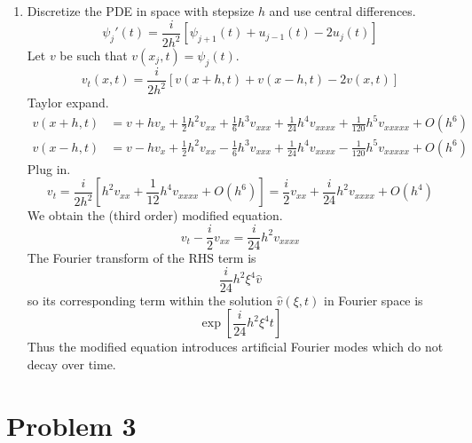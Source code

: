 \documentclass{article}
\newcommand{\sbr}[1]{\left[#1\right]}
\begin{document}
\begin{enumerate}[label=(\alph*)]
\item
Discretize the PDE in space with stepsize $h$ and use central differences.
$$\psi_j'(t) = \frac{i}{2h^2}[\psi_{j+1}(t) + u_{j-1}(t) - 2u_j(t)]$$
Let $v$ be such that $v(x_j,t)=\psi_j(t)$.
$$v_t(x,t) = \frac{i}{2h^2}[v(x+h,t) + v(x-h,t) - 2v(x,t)]$$
Taylor expand.
\begin{align*}
	v(x+h,t) &= v + hv_x + \frac12h^2v_{xx} + \frac16h^3v_{xxx} + \frac{1}{24}h^4v_{xxxx} + \frac{1}{120}h^5v_{xxxxx} + O(h^6)\\
	v(x-h,t) &= v - hv_x + \frac12h^2v_{xx} - \frac16h^3v_{xxx} + \frac{1}{24}h^4v_{xxxx} - \frac{1}{120}h^5v_{xxxxx} + O(h^6)
\end{align*}
Plug in.
$$v_t = \frac{i}{2h^2}\sbr{h^2v_{xx} + \frac{1}{12}h^4v_{xxxx} + O(h^6)}
= \frac i2v_{xx} + \frac{i}{24}h^2v_{xxxx} + O(h^4)$$
We obtain the (third order) modified equation.
$$v_t - \frac i2v_{xx} = \frac{i}{24}h^2v_{xxxx}$$
The Fourier transform of the RHS term is
$$\frac{i}{24}h^2\xi^4\hat v$$
so its corresponding term within the solution $\hat v(\xi,t)$ in Fourier space is
$$\exp[\frac{i}{24}h^2\xi^4t]$$
Thus the modified equation introduces artificial Fourier modes which do not decay over time.

\end{enumerate}



\section*{Problem 3}
\end{document}
